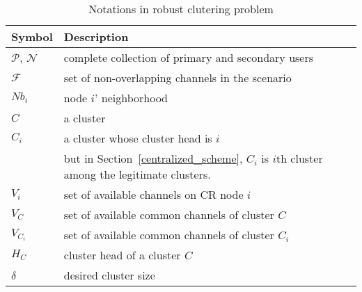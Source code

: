 
\begin{table}[h!]
\caption{Notations in robust clutering problem}
\label{tab1}
\centering
\begin{tabular}{llr}
\toprule
Symbol & Description \\
\midrule
$\mathcal{P}$, $\mathcal{N}$  & complete collection of primary and secondary users\\
$\mathcal{F}$ & set of non-overlapping channels in the scenario\\
$Nb_i$ & node $i$' neighborhood     \\
$C$ & a cluster \\
$C_i$ & a cluster whose cluster head is $i$ \\
& but in Section~\ref{centralized_scheme}, $C_i$ is $i$th cluster among the legitimate clusters.\\
$V_i$   & set of available channels on CR node $i$  \\
$V_C$   & set of available common channels of cluster $C$  \\
$V_{C_i}$   & set of available common channels of cluster $C_i$\\
$H_C$ & cluster head of a cluster $C$\\
$\delta$ & desired cluster size\\

\end{tabular}
\end{table}
